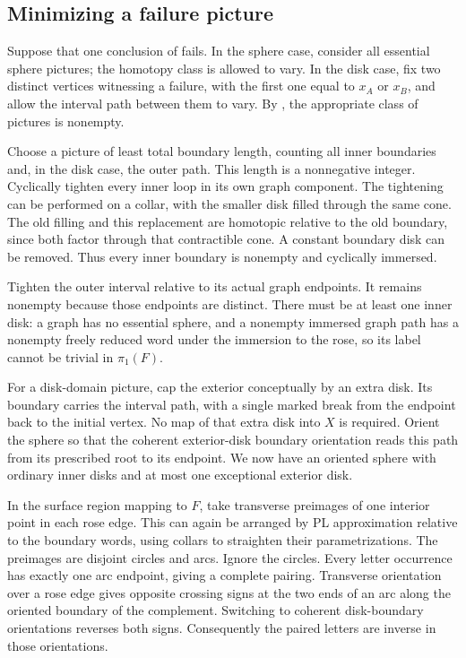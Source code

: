 \subsection{Minimizing a failure picture}

Suppose that one conclusion of  fails. In the sphere case, consider all essential sphere pictures; the homotopy class is allowed to vary. In the disk case, fix two distinct vertices witnessing a failure, with the first one equal to \(x_A\) or \(x_B\), and allow the interval path between them to vary. By , the appropriate class of pictures is nonempty.

Choose a picture of least total boundary length, counting all inner boundaries and, in the disk case, the outer path. This length is a nonnegative integer. Cyclically tighten every inner loop in its own graph component. The tightening can be performed on a collar, with the smaller disk filled through the same cone. The old filling and this replacement are homotopic relative to the old boundary, since both factor through that contractible cone. A constant boundary disk can be removed. Thus every inner boundary is nonempty and cyclically immersed.

Tighten the outer interval relative to its actual graph endpoints. It remains nonempty because those endpoints are distinct. There must be at least one inner disk: a graph has no essential sphere, and a nonempty immersed graph path has a nonempty freely reduced word under the immersion to the rose, so its label cannot be trivial in \(\pi_1(F)\).

For a disk-domain picture, cap the exterior conceptually by an extra disk. Its boundary carries the interval path, with a single marked break from the endpoint back to the initial vertex. No map of that extra disk into \(X\) is required. Orient the sphere so that the coherent exterior-disk boundary orientation reads this path from its prescribed root to its endpoint. We now have an oriented sphere with ordinary inner disks and at most one exceptional exterior disk.

In the surface region mapping to \(F\), take transverse preimages of one interior point in each rose edge. This can again be arranged by PL approximation relative to the boundary words, using collars to straighten their parametrizations. The preimages are disjoint circles and arcs. Ignore the circles. Every letter occurrence has exactly one arc endpoint, giving a complete pairing. Transverse orientation over a rose edge gives opposite crossing signs at the two ends of an arc along the oriented boundary of the complement. Switching to coherent disk-boundary orientations reverses both signs. Consequently the paired letters are inverse in those orientations.

